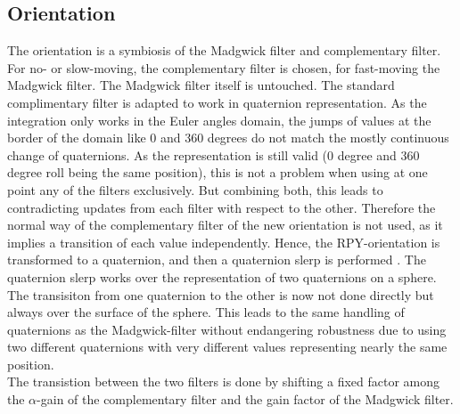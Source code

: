 \documentclass[letterpaper, 10 pt, conference]{ieeeconf}  %
\begin{document}
\subsection{Orientation}
The orientation is a symbiosis of the Madgwick filter and complementary filter. For no- or slow-moving, the complementary filter is chosen, for fast-moving the Madgwick filter. The Madgwick filter itself is untouched.
The standard complimentary filter is adapted to work in quaternion representation.
 As the integration only works in the Euler angles domain, the jumps of values at the border of the domain like 0 and 360 degrees do not match the mostly continuous change of quaternions.
As the representation is still valid (0 degree and 360 degree roll being the same position), this is not a problem when using at one point any of the filters exclusively.
 But combining both, this leads to contradicting updates from each filter with respect to the other.
 Therefore the normal way of the complementary filter of the new orientation is 
not used, as it implies a transition of each value independently.
Hence, the RPY-orientation is transformed to a quaternion, and then a quaternion slerp is performed \cite{c4}.
 The quaternion slerp works over the representation of two quaternions on a sphere. The transisiton from one quaternion to the other is now not done directly but always over the surface of the sphere.
 This leads to the same handling of quaternions as the Madgwick-filter without endangering robustness due to using two different quaternions with very different values representing nearly the same position.\\
The transistion between the two filters is done by shifting a fixed factor among the $\alpha$-gain of the complementary filter and the gain factor of the Madgwick filter.
\end{document}

